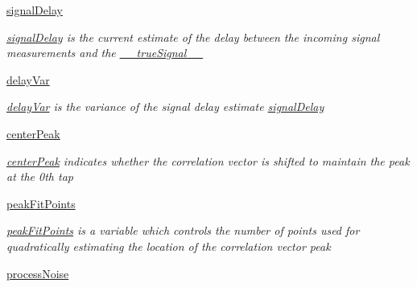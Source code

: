 \begin{DoxyCompactItemize}
\hyperlink{classmodest_1_1substates_1_1CorrelationVector_1_1CorrelationVector_ab1dbedfba4787748c5778359b78dc3cf}{signal\+Delay}
\begin{DoxyCompactList}\small\item\em \hyperlink{classmodest_1_1substates_1_1CorrelationVector_1_1CorrelationVector_ab1dbedfba4787748c5778359b78dc3cf}{signal\+Delay} is the current estimate of the delay between the incoming signal measurements and the \hyperlink{classmodest_1_1substates_1_1CorrelationVector_1_1CorrelationVector_a40f65c10e255c043d8f56d17d152e705}{\+\_\+\+\_\+true\+Signal\+\_\+\+\_\+} \end{DoxyCompactList}\item 
\hyperlink{classmodest_1_1substates_1_1CorrelationVector_1_1CorrelationVector_af26efaaeaeff4ef313b8f1654559787a}{delay\+Var}
\begin{DoxyCompactList}\small\item\em \hyperlink{classmodest_1_1substates_1_1CorrelationVector_1_1CorrelationVector_af26efaaeaeff4ef313b8f1654559787a}{delay\+Var} is the variance of the signal delay estimate \hyperlink{classmodest_1_1substates_1_1CorrelationVector_1_1CorrelationVector_ab1dbedfba4787748c5778359b78dc3cf}{signal\+Delay} \end{DoxyCompactList}\item 
\hyperlink{classmodest_1_1substates_1_1CorrelationVector_1_1CorrelationVector_ad98b9e809e03a82b0e0d89ea37a97352}{center\+Peak}
\begin{DoxyCompactList}\small\item\em \hyperlink{classmodest_1_1substates_1_1CorrelationVector_1_1CorrelationVector_ad98b9e809e03a82b0e0d89ea37a97352}{center\+Peak} indicates whether the correlation vector is shifted to maintain the peak at the 0th tap \end{DoxyCompactList}\item 
\hyperlink{classmodest_1_1substates_1_1CorrelationVector_1_1CorrelationVector_a3a6c344370944a5e84a064cd26d1db81}{peak\+Fit\+Points}
\begin{DoxyCompactList}\small\item\em \hyperlink{classmodest_1_1substates_1_1CorrelationVector_1_1CorrelationVector_a3a6c344370944a5e84a064cd26d1db81}{peak\+Fit\+Points} is a variable which controls the number of points used for quadratically estimating the location of the correlation vector peak \end{DoxyCompactList}\item 
\hyperlink{classmodest_1_1substates_1_1CorrelationVector_1_1CorrelationVector_a975d7f4a8ff295bad20c31dee8fe0370}{process\+Noise}

\end{DoxyCompactItemize}
